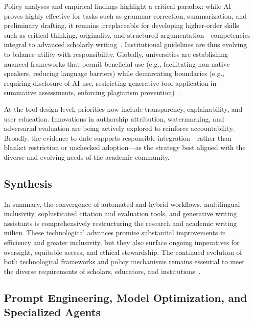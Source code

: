 Policy analyses and empirical findings highlight a critical paradox: while AI proves highly effective for tasks such as grammar correction, summarization, and preliminary drafting, it remains irreplaceable for developing higher-order skills such as critical thinking, originality, and structured argumentation—competencies integral to advanced scholarly writing~\cite{ref104,ref109,ref110}. Institutional guidelines are thus evolving to balance utility with responsibility. Globally, universities are establishing nuanced frameworks that permit beneficial use (e.g., facilitating non-native speakers, reducing language barriers) while demarcating boundaries (e.g., requiring disclosure of AI use, restricting generative tool application in summative assessments, enforcing plagiarism prevention)~\cite{ref104,ref110}.

At the tool-design level, priorities now include transparency, explainability, and user education. Innovations in authorship attribution, watermarking, and adversarial evaluation are being actively explored to reinforce accountability. Broadly, the evidence to date supports responsible integration—rather than blanket restriction or unchecked adoption—as the strategy best aligned with the diverse and evolving needs of the academic community.

\subsection{Synthesis}

In summary, the convergence of automated and hybrid workflows, multilingual inclusivity, sophisticated citation and evaluation tools, and generative writing assistants is comprehensively restructuring the research and academic writing milieu. These technological advances promise substantial improvements in efficiency and greater inclusivity, but they also surface ongoing imperatives for oversight, equitable access, and ethical stewardship. The continued evolution of both technological frameworks and policy mechanisms remains essential to meet the diverse requirements of scholars, educators, and institutions~\cite{ref10,ref11,ref12,ref28,ref29,ref30,ref31,ref35,ref36,ref37,ref38,ref39,ref46,ref47,ref49,ref51,ref62,ref76,ref80,ref86,ref88,ref89,ref90,ref91,ref92,ref93,ref94,ref96,ref97,ref98,ref100,ref102,ref104,ref105,ref107,ref108,ref109,ref110}.

\subsection{Prompt Engineering, Model Optimization, and Specialized Agents}

